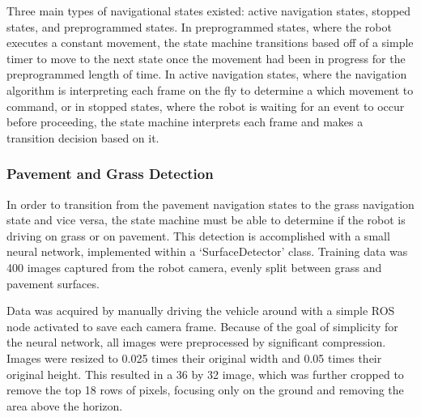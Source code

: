 \documentclass[titlepage, twocolumn]{article}
\begin{document}
        Three main types of navigational states existed: active navigation states, stopped states, and preprogrammed states. In preprogrammed states, where the robot executes a constant movement, the state machine transitions based off of a simple timer to move to the next state once the movement had been in progress for the preprogrammed length of time. In active navigation states, where the navigation algorithm is interpreting each frame on the fly to determine a which movement to command, or in stopped states, where the robot is waiting for an event to occur before proceeding, the state machine interprets each frame and makes a transition decision based on it.

        \subsubsection{Pavement and Grass Detection}
            In order to transition from the pavement navigation states to the grass navigation state and vice versa, the state machine must be able to determine if the robot is driving on grass or on pavement. This detection is accomplished with a small neural network, implemented within a `SurfaceDetector' class. Training data was 400 images captured from the robot camera, evenly split between grass and pavement surfaces. 
            
            Data was acquired by manually driving the vehicle around with a simple ROS node activated to save each camera frame. Because of the goal of simplicity for the neural network, all images were preprocessed by significant compression. Images were resized to 0.025 times their original width and 0.05 times their original height. This resulted in a 36 by 32 image, which was further cropped to remove the top 18 rows of pixels, focusing only on the ground and removing the area above the horizon.
\end{document}
